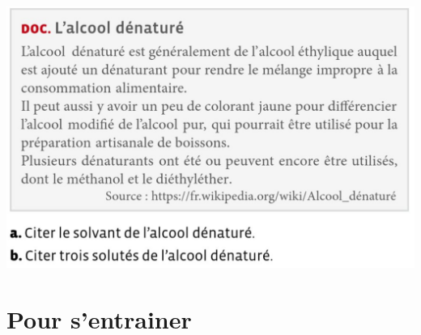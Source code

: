 \begin{center}
    \includegraphics[scale=0.6]{Images/Chapitre_2/Exo_Doc.png}
\end{center}


\section{Pour s'entrainer}


